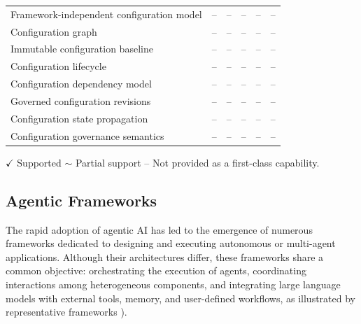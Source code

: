 \documentclass[10pt]{article}
\begin{document}
\begin{table}[t]
\begin{tabular}{p{4.2cm}ccccc}
\midrule

Framework-independent configuration model
                                 & -- & -- & -- & -- & -- \\

Configuration graph              & -- & -- & -- & -- & -- \\

Immutable configuration baseline & -- & -- & -- & -- & -- \\

Configuration lifecycle          & -- & -- & -- & -- & -- \\

Configuration dependency model   & -- & -- & -- & -- & -- \\

Governed configuration revisions & -- & -- & -- & -- & -- \\

Configuration state propagation  & -- & -- & -- & -- & -- \\

Configuration governance semantics
                                 & -- & -- & -- & -- & -- \\

\bottomrule
\end{tabular}

\vspace{1mm}

\footnotesize
$\checkmark$ Supported \hspace{1em}
$\sim$ Partial support \hspace{1em}
-- Not provided as a first-class capability.

\end{table}

\subsection{Agentic Frameworks}
\label{sec:agentic_frameworks}

The rapid adoption of agentic AI has led to the emergence of numerous frameworks dedicated to designing and executing autonomous or multi-agent applications. Although their architectures differ, these frameworks share a common objective: orchestrating the execution of agents, coordinating interactions among heterogeneous components, and integrating large language models with external tools, memory, and user-defined workflows, as illustrated by representative frameworks \cite{crewaidocs, langgraphdocs, googleadkdocs, microsoftadkdocs, openaiddocs, claudedocs, mistraldocs}).
\end{document}
